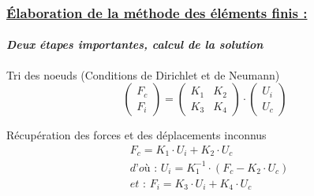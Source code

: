 \documentclass[10pt]{beamer}
\begin{document}
	\begin{frame}
		\frametitle{\uline{\'Elaboration de la m\'ethode des \'el\'ements finis :}}
		\framesubtitle{\textit{Deux \'etapes importantes, calcul de la solution }}
		\begin{block}{Tri des noeuds (Conditions de Dirichlet et de Neumann)}
			\begin{equation}
				\begin{pmatrix}
				F_c \\
				F_i
				\end{pmatrix}
				=
				\begin{pmatrix}
				K_1 & K_2 \\
				K_3 & K_4
				\end{pmatrix}
				\cdot
				\begin{pmatrix}
				U_i \\
				U_c
				\end{pmatrix}
			\end{equation}
		\end{block}
		\begin{block}{R\'ecup\'eration des forces et des d\'eplacements inconnus}
			\begin{align}
				&F_c = K_1 \cdot U_i + K_2 \cdot U_c\\
				&\textit{d'o\`u : } U_i = K_1^{-1} \cdot (F_c - K_2 \cdot U_c)\\
				&\textit{et : } F_i = K_3 \cdot U_i + K_4 \cdot U_c
			\end{align}
		\end{block}
	\end{frame}
\end{document}

